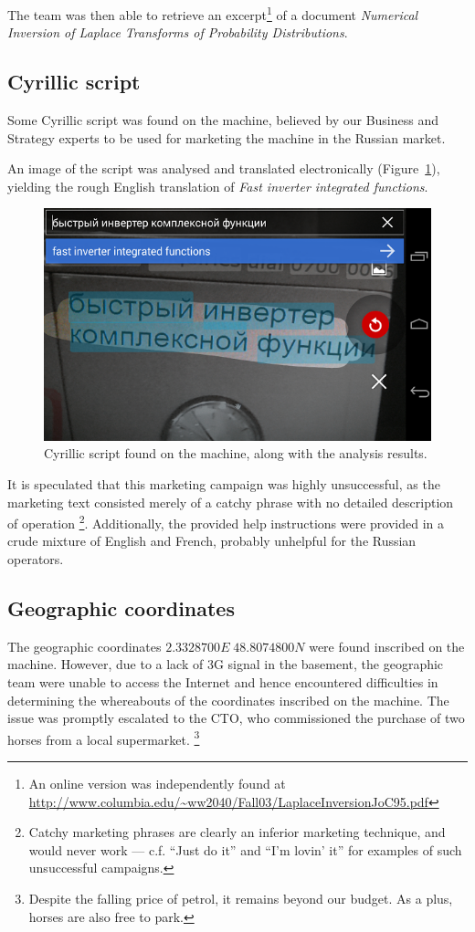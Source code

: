 The team was then able to retrieve an excerpt\footnote{An online version was independently found at \url{http://www.columbia.edu/~ww2040/Fall03/LaplaceInversionJoC95.pdf}} of a document \emph{Numerical Inversion of Laplace Transforms of Probability Distributions}.


\subsection{Cyrillic script}
Some Cyrillic script was found on the machine, believed by our Business and Strategy experts to be used for marketing the machine in the Russian market.

An image of the script was analysed and translated electronically (Figure~\ref{fig:cyrillic-script}), yielding the rough English translation of \emph{Fast inverter integrated functions}.

\begin{figure}[h]
	\centering
	\includegraphics[width=0.9\columnwidth]{img/cyrillic-script.png}
	\caption{Cyrillic script found on the machine, along with the analysis results.}
	\label{fig:cyrillic-script}
\end{figure}

It is speculated that this marketing campaign was highly unsuccessful, as the marketing text consisted merely of a catchy phrase with no detailed description of operation \footnote{Catchy marketing phrases are clearly an inferior marketing technique, and would never work --- c.f. ``Just do it'' and ``I'm lovin' it'' for examples of such unsuccessful campaigns.}. Additionally, the provided help instructions were provided in a crude mixture of English and French, probably unhelpful for the Russian operators.




\subsection{Geographic coordinates}
The geographic coordinates $2.3328700E \; 48.8074800N$ were found inscribed on the machine. However, due to a lack of 3G signal in the basement, the geographic team were unable to access the Internet and hence encountered difficulties in determining the whereabouts of the coordinates inscribed on the machine. The issue was promptly escalated to the CTO, who commissioned the purchase of two horses from a local supermarket. \footnote{Despite the falling price of petrol, it remains beyond our budget. As a plus, horses are also free to park.}

